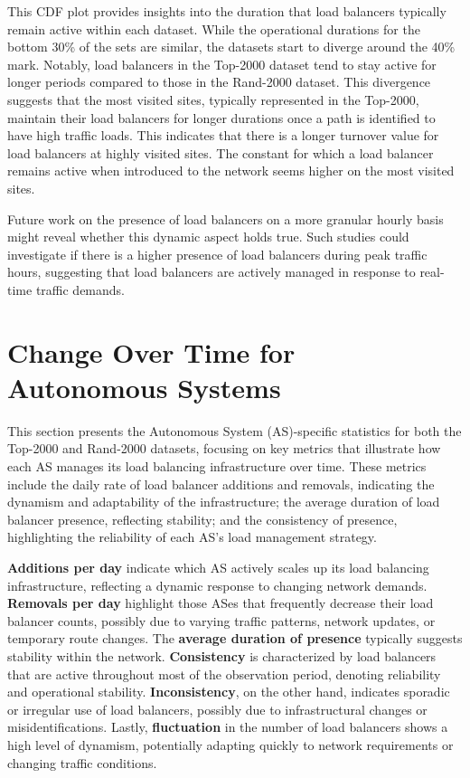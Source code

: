 \documentclass[12pt]{cwru_thesis}
\begin{document}
This CDF plot provides insights into the duration that load balancers typically remain active within each dataset. While the operational durations for the bottom 30\% of the sets are similar, the datasets start to diverge around the 40\% mark. Notably, load balancers in the Top-2000 dataset tend to stay active for longer periods compared to those in the Rand-2000 dataset. This divergence suggests that the most visited sites, typically represented in the Top-2000, maintain their load balancers for longer durations once a path is identified to have high traffic loads. This indicates that there is a longer turnover value for load balancers at highly visited sites. The constant for which a load balancer remains active when introduced to the network seems higher on the most visited sites.



Future work on the presence of load balancers on a more granular hourly basis might reveal whether this dynamic aspect holds true. Such studies could investigate if there is a higher presence of load balancers during peak traffic hours, suggesting that load balancers are actively managed in response to real-time traffic demands.


\section{Change Over Time for Autonomous Systems}

This section presents the Autonomous System (AS)-specific statistics for both the Top-2000 and Rand-2000 datasets, focusing on key metrics that illustrate how each AS manages its load balancing infrastructure over time. These metrics include the daily rate of load balancer additions and removals, indicating the dynamism and adaptability of the infrastructure; the average duration of load balancer presence, reflecting stability; and the consistency of presence, highlighting the reliability of each AS's load management strategy.


\textbf{Additions per day} indicate which AS actively scales up its load balancing infrastructure, reflecting a dynamic response to changing network demands. \textbf{Removals per day} highlight those ASes that frequently decrease their load balancer counts, possibly due to varying traffic patterns, network updates, or temporary route changes. The \textbf{average duration of presence} typically suggests stability within the network. \textbf{Consistency} is characterized by load balancers that are active throughout most of the observation period, denoting reliability and operational stability. \textbf{Inconsistency}, on the other hand, indicates sporadic or irregular use of load balancers, possibly due to infrastructural changes or misidentifications. Lastly, \textbf{fluctuation} in the number of load balancers shows a high level of dynamism, potentially adapting quickly to network requirements or changing traffic conditions.
\end{document}
